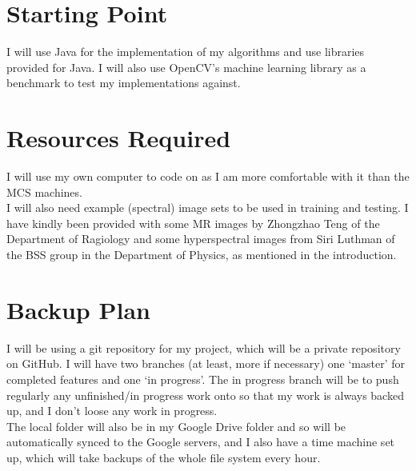 \documentclass[12pt,a4paper,twoside]{article}
\begin{document}

\section*{Starting Point}

I will use Java for the implementation of my algorithms and use libraries 
provided for Java. I will also use OpenCV's machine learning library as a 
benchmark to test my implementations against. 




\section*{Resources Required}

I will use my own computer to code on as I am more comfortable with it than the 
MCS machines. \\

I will also need example (spectral) image sets to be used in training and 
testing. I have kindly been provided with some MR images by Zhongzhao Teng of 
the Department of Ragiology and some hyperspectral images from Siri Luthman of 
the BSS group in the Department of Physics, as mentioned in the introduction.




\section*{Backup Plan}

I will be using a git repository for my project, which will be a private 
repository on GitHub. I will have two branches (at least, more if necessary) one 
`master' for completed features and one `in progress'. The in progress branch 
will be to push regularly any unfinished/in progress work onto so that my work 
is always backed up, and I don't loose any work in progress. \\

The local folder will also be in my Google Drive folder and so will be 
automatically synced to the Google servers, and I also have a time machine 
set up, which will take backups of the whole file system every hour.
\end{document}
